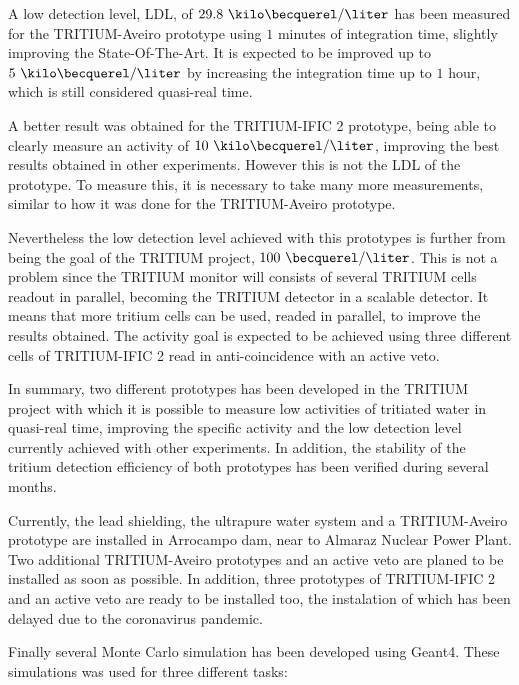 A low detection level, LDL, of $29.8~\kilo\becquerel/\liter$ has been measured for the TRITIUM-Aveiro prototype using $1$ minutes of integration time, slightly improving the State-Of-The-Art. It is expected to be improved up to $5~\kilo\becquerel/\liter$ by increasing the integration time up to $1$ hour, which is still considered quasi-real time.

A better result was obtained for the TRITIUM-IFIC 2 prototype, being able to clearly measure an activity of $10~\kilo\becquerel/\liter$, improving the best results obtained in other experiments. However this is not the LDL of the prototype. To measure this, it is necessary to take many more measurements, similar to how it was done for the TRITIUM-Aveiro prototype.

Nevertheless the low detection level achieved with this prototypes is further from being the goal of the TRITIUM project, $100~\becquerel/\liter$. This is not a problem since the TRITIUM monitor will consists of several TRITIUM cells readout in parallel, becoming the TRITIUM detector in a scalable detector. It means that more tritium cells can be used, readed in parallel, to improve the results obtained. The activity goal is expected to be achieved using three different cells of TRITIUM-IFIC 2 read in anti-coincidence with an active veto.

In summary, two different prototypes has been developed in the TRITIUM project with which it is possible to measure low activities of tritiated water in quasi-real time, improving the specific activity and the low detection level currently achieved with other experiments. In addition, the stability of the tritium detection efficiency of both prototypes has been verified during several months.

Currently, the lead shielding, the ultrapure water system and a TRITIUM-Aveiro prototype are installed in Arrocampo dam, near to Almaraz Nuclear Power Plant. Two additional TRITIUM-Aveiro prototypes and an active veto are planed to be installed as soon as possible. In addition, three prototypes of TRITIUM-IFIC 2 and an active veto are ready to be installed too, the instalation of which has been delayed due to the coronavirus pandemic.

Finally several Monte Carlo simulation has been developed using Geant4. These simulations was used for three different tasks:

